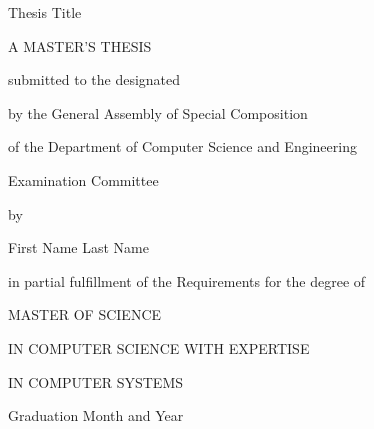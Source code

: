 \begin{center}
	{\LARGE Thesis Title}
	\par
	\vspace{2.5cm} {\Large A MASTER'S THESIS}
	
	\vspace{1.25cm} {\Large submitted to the designated}
	
	\vspace{0.75cm} {\Large by the General Assembly of Special Composition}
	
	\vspace{0.25cm} {\Large of the Department of Computer Science and Engineering}
	
	\vspace{0.25cm} {\Large Examination Committee}
	
	\vspace{1.25cm} {\Large by}
	
	\vspace{1.75cm} {\LARGE First Name Last Name}
	
	\vspace{1.25cm} {\Large in partial fulfillment of the Requirements for the degree of}
	
	\vspace{1.75cm} {\Large MASTER OF SCIENCE}
	
	\vspace{0.5cm} {\Large IN COMPUTER SCIENCE WITH EXPERTISE}
	
	\vspace{0.5cm} {\Large IN COMPUTER SYSTEMS}
	\par
	\vfill {\Large Graduation Month and Year}
\end{center}

\thispagestyle{empty}
